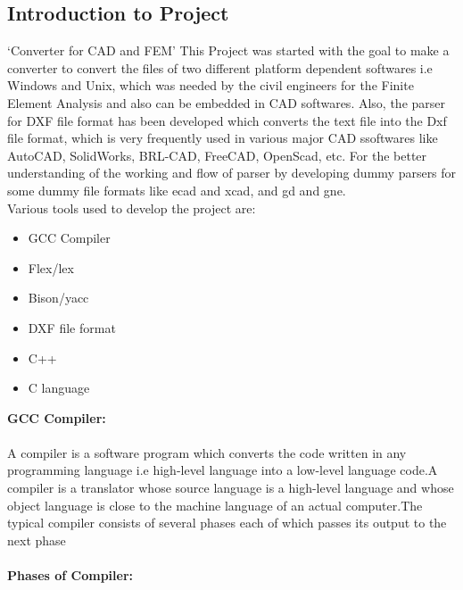 \subsection{Introduction to Project}
‘Converter for CAD and FEM’ This Project was started with the goal to make a converter to convert the files of two different platform dependent softwares i.e Windows and Unix, which was needed by the civil engineers for the Finite Element Analysis and also can be embedded in CAD softwares. Also, the parser for DXF file format has been developed which converts the text file into the Dxf file format, which is very frequently used in various major CAD ssoftwares like AutoCAD, SolidWorks, BRL-CAD, FreeCAD, OpenScad, etc. For the better understanding of the working and flow of parser by developing dummy parsers for some dummy file formats like ecad and xcad, and gd and gne.\\
Various tools used to develop the project are:\\
\begin{itemize}
\item GCC Compiler
\item Flex/lex
\item Bison/yacc
\item DXF file format
\item C++
\item C language
\end{itemize}
\textbf{GCC Compiler:}\\\\
A compiler is a software program which converts the code written in any programming language i.e high-level language into a low-level language code.A compiler is a translator whose source language is a high-level language and whose object language is close to the machine language of an actual computer.The typical compiler consists of several phases each of which passes its output to the next phase\\\\
\textbf{Phases of Compiler:}
